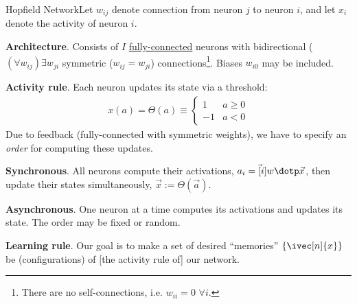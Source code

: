 \documentclass[11pt]{article}
\begin{document}
\begin{itemdefinition}{Hopfield Network}{Let $w_{ij}$ denote connection from neuron $j$ to neuron $i$, and let $x_i$ denote the activity of neuron $i$.}
	\item \textbf{Architecture}. Consists of $I$ \underline{fully-connected} neurons with bidirectional ($(\forall w_{ij}) \exists w_{ji}$ symmetric ($w_{ij} = w_{ji}$)  connections\footnote{There are no self-connections, i.e. $w_{ii} = 0$ $\forall i$.}. Biases $w_{i0}$ may be included. 
	
	\item \textbf{Activity rule}. Each neuron updates its state via a threshold:
	\begin{align}
		x(a) = \Theta(a) \equiv \begin{cases}
			1 & a \ge 0 \\
			-1 & a < 0 
		\end{cases}
	\end{align}
	Due to feedback (fully-connected with symmetric weights), we have to specify an \textit{order} for computing these updates. 
	\begin{compactitem}
		\item \textbf{Synchronous}. All neurons compute their activations, $a_i = \vec[i]{w} \dotp \vec{x}$, then update their states simultaneously, $\vec x := \Theta(\vec a)$. 
		\item \textbf{Asynchronous}. One neuron at a time computes its activations and updates its state. The order may be fixed or random. 
	\end{compactitem}

	\item \textbf{Learning rule}. Our goal is to make a set of desired ``memories'' $\{\ivec[n]{x}\}$ be  (configurations) of [the activity rule of] our network.
\end{itemdefinition}
\end{document}
